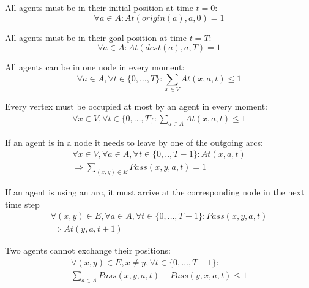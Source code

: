\documentclass[12pt, a4paper, hidelinks]{article}
\numberwithin{equation}{section}
\begin{document}
\begin{description}\label{equation_set_1}
\item All agents must be in their initial position at time $t = 0$:
\begin{equation}
\forall a \in A: At(origin(a), a, 0) = 1
\label{eq:1.1}\end{equation}

\item All agents must be in their goal position at time $t = T$:
\begin{equation}
\forall a \in A : At(dest(a), a, T) = 1
\label{eq:1.2}\end{equation}

\item All agents can be in one node in every moment:
\begin{equation}
\forall a \in A, \forall t \in \{0,\dots,T\}: \displaystyle\sum_{x \in V}At(x,a,t)\leq1
\label{eq:1.3}\end{equation}

\item Every vertex must be occupied at most by an agent in every moment:
\begin{equation}\begin{split}
\forall x \in V, \forall t \in \{0,\dots,T\}: \displaystyle\sum_{a \in A}At(x,a,t)\leq1
\end{split}\label{eq:1.4}\end{equation}

\item If an agent is in a node it needs to leave by one of the outgoing arcs:
\begin{equation}\begin{split}
\forall x \in V, \forall a \in A, \forall t \in \{0,..,T-1\}: At(x,a,t) \\
\Rightarrow  \displaystyle\sum_{(x,y) \in E}Pass(x,y,a,t)=1
\end{split}\label{eq:1.5}\end{equation}

\item If an agent is using an arc, it must arrive at the corresponding node in the next time step
\begin{equation}\begin{split}
\forall (x,y) \in E, \forall a \in A, \forall t \in \{0,\dots,T-1\}: Pass(x,y,a,t) \\
\Rightarrow At(y,a,t+1)
\end{split}\label{eq:1.6}
\end{equation}

\item Two agents cannot exchange their positions:
\begin{equation}\begin{split}
\forall (x,y) \in E, x \neq y, \forall t \in \{0,\dots,T-1\}: \\
\displaystyle\sum_{a \in A}Pass(x,y,a,t) + Pass(y,x,a,t) \leq 1
\end{split}\label{eq:1.7}\end{equation}
\end{description}
\end{document}
